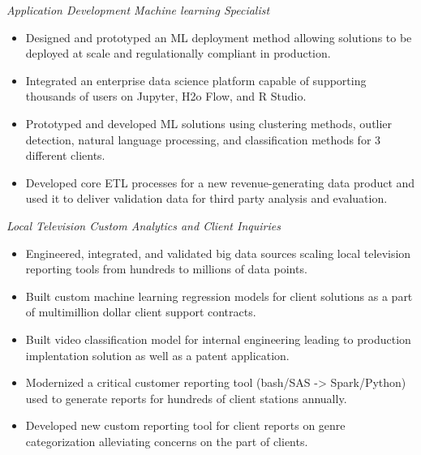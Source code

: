 \documentclass[10pt,a4paper,ragged2e]{altacv}
\begin{document}

\begin{fullwidth}
\makecvheader
\end{fullwidth}



\textit{Application Development Machine learning Specialist}
\begin{itemize}
\item  Designed and prototyped an ML deployment method allowing solutions to be deployed at scale and regulationally compliant in production.
\item Integrated an enterprise data science platform capable of supporting thousands of users on Jupyter, H2o Flow, and R Studio. 
\item Prototyped and developed ML solutions using clustering methods,  outlier detection, natural language processing, and classification methods for 3 different clients. 
\item Developed core ETL processes for a new revenue-generating data product and used it to deliver validation data for third party analysis and evaluation.
\end{itemize}

\divider

\textit{Local Television Custom Analytics and Client Inquiries}
\begin{itemize}
\item Engineered, integrated, and validated big data sources scaling local television reporting tools from hundreds to millions of data points.
\item Built custom machine learning regression models for client solutions as a part of multimillion dollar client support contracts.
\item Built video classification model for internal engineering leading to production implentation solution as well as a patent application.
\item Modernized a critical customer reporting tool (bash/SAS -> Spark/Python) used to generate reports for hundreds of client stations annually.
\item Developed new custom reporting tool for client reports on genre categorization alleviating concerns on the part of clients.
\end{itemize}
\end{document}

